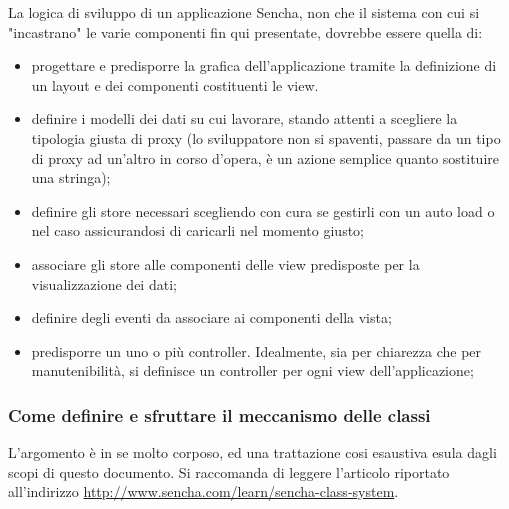 \documentclass[10pt,a4paper,onecolumn]{article}
\begin{document}
La logica di sviluppo di un applicazione Sencha, non che il sistema con cui si "incastrano" le varie componenti fin qui presentate, dovrebbe essere quella di:
\begin{itemize}
	\item progettare e predisporre la grafica dell'applicazione tramite la definizione di un layout e dei componenti costituenti le view.
	\item definire i modelli dei dati su cui lavorare, stando attenti a scegliere la tipologia giusta di proxy (lo sviluppatore non si spaventi, passare da un tipo di proxy ad un'altro in corso d'opera, è un azione semplice quanto sostituire una stringa);
	\item definire gli store necessari scegliendo con cura se gestirli con un auto load o nel caso assicurandosi di caricarli nel momento giusto;
	\item associare gli store alle componenti delle view predisposte per la visualizzazione dei dati;
	\item definire degli eventi da associare ai componenti della vista;
	\item predisporre un uno o più controller. Idealmente, sia per chiarezza che per manutenibilità, si definisce un controller per ogni view dell'applicazione;
\end{itemize}

\subsubsection{Come definire e sfruttare il meccanismo delle classi}
L'argomento è in se molto corposo, ed una trattazione cosi esaustiva esula dagli scopi di questo documento. Si raccomanda di leggere l'articolo riportato all'indirizzo \url{http://www.sencha.com/learn/sencha-class-system}.
\end{document}
